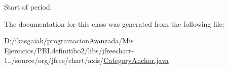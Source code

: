 Start of period. 

The documentation for this class was generated from the following file\+:\begin{DoxyCompactItemize}
\item 
D\+:/ikasgaiak/programacion\+Avanzada/\+Mis Ejercicios/\+P\+B\+Ldefinitibo2/libs/jfreechart-\/1../source/org/jfree/chart/axis/\mbox{\hyperlink{_category_anchor_8java}{Category\+Anchor.\+java}}\end{DoxyCompactItemize}
